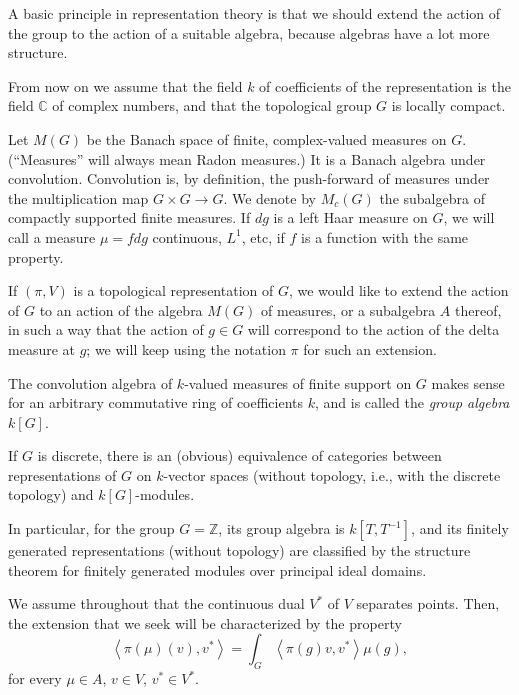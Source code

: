 A basic principle in representation theory is that we should extend the action of the group to the action of a suitable algebra, because algebras have a lot more structure.


From now on we assume that the field $k$ of coefficients of the representation is the field $\mathbb C$ of complex numbers, and that the topological group $G$ is locally compact. 

Let $M(G)$ be the Banach space of finite, complex-valued measures on $G$. (``Measures'' will always mean Radon measures.) It is a Banach algebra under convolution. Convolution is, by definition, the push-forward of measures under the multiplication map $G\times G \to G$. We denote by $M_c(G)$ the subalgebra of compactly supported finite measures. If $dg$ is a left Haar measure on $G$, we will call a measure $\mu= f dg$ continuous, $L^1$, etc, if $f$ is a function with the same property.



If $(\pi, V)$ is a topological representation of $G$, we would like to extend the action of $G$ to an action of the algebra $M(G)$ of measures, or a subalgebra $A$ thereof, in such a way that the action of $g\in G$ will correspond to the action of the delta measure at $g$; we will keep using the notation $\pi$ for such an extension. 

\begin{example}
\label{example-groupalgebra}
The convolution algebra of $k$-valued measures of finite support on $G$ makes sense for an arbitrary commutative ring of coefficients $k$, and is called the {\it group algebra} $k[G]$. 

If $G$ is discrete, there is an (obvious) equivalence of categories between representations of $G$ on $k$-vector spaces (without topology, i.e., with the discrete topology) and $k[G]$-modules.
\end{example}



\begin{example}
\label{example-groupalgebra-Z}
In particular, for the group $G=\mathbb Z$, its group algebra is $k[T,T^{-1}]$, and its finitely generated representations (without topology) are classified by the structure theorem for finitely generated modules over principal ideal domains.
\end{example}



We assume throughout that the continuous dual $V^*$ of $V$ separates points. Then, the extension that we seek will be characterized by the property
\begin{equation}
\label{equation-action-measures}
\left<\pi(\mu)(v), v^*\right> = \int_G \left<\pi(g)v, v^*\right> \mu(g),
\end{equation}
for every $\mu\in A$, $v\in V$, $v^*\in V^*$. 

